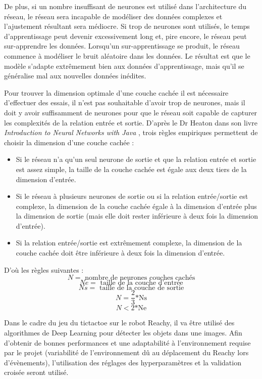 De plus, si un nombre insuffisant de neurones est utilisé dans l'architecture du réseau, le réseau sera incapable de modéliser des données complexes et l'ajustement résultant sera médiocre. Si trop de neurones sont utilisés, le temps d'apprentissage peut devenir excessivement long et, pire encore, le réseau peut sur-apprendre les données. Lorsqu'un sur-apprentissage se produit, le réseau commence à modéliser le bruit aléatoire dans les données. Le résultat est que le modèle s'adapte extrêmement bien aux données d'apprentissage, mais qu'il se généralise mal aux nouvelles données inédites. 

Pour trouver la dimension optimale d'une couche cachée il est nécessaire d'effectuer des essais, il n'est pas souhaitable d'avoir trop de neurones, mais il doit y avoir suffisamment de neurones pour que le réseau soit capable de capturer les complexités de la relation entrée et sortie. D'après le Dr Heaton dans son livre \textit{Introduction to Neural Networks with Java} \cite{heaton_introduction_2008},  trois règles empiriques permettent de choisir la dimension d'une couche cachée : 
\begin{itemize}
    \item Si le réseau n'a qu'un seul neurone de sortie et que la relation entrée et sortie est assez simple, la taille de la couche cachée est égale aux deux tiers de la dimension d'entrée.
    \item Si le réseau à plusieurs neurones de sortie ou si la relation entrée/sortie est complexe, la dimension de la couche cachée égale à la dimension d'entrée plus la dimension de sortie (mais elle doit rester inférieure à deux fois la dimension d'entrée).
    \item Si la relation entrée/sortie est extrêmement complexe, la dimension de la couche cachée doit être inférieure à deux fois la dimension d'entrée. 
\end{itemize}
D'où les règles suivantes : \\
    \[N =  \textrm{ nombre de neurones couches cachés}\]
    \[Ne =  \textrm{ taille de la couche d'entrée}\]
    \[Ns =  \textrm{ taille de la couche de sortie}\]
    \[N = \dfrac23 \textrm{*Ns}\]
    \[N < \textrm{2*Ne}\]
    

Dans le cadre du jeu du tictactoe sur le robot Reachy, il va être utilisé des algorithmes de Deep Learning pour détecter les objets dans une images. Afin d'obtenir de bonnes performances et une adaptabilité à l'environnement requise par le projet (variabilité de l'environnement dû au déplacement du Reachy lors d'évènements), l'utilisation des réglages des hyperparamètres et la validation croisée seront utilisé.  




